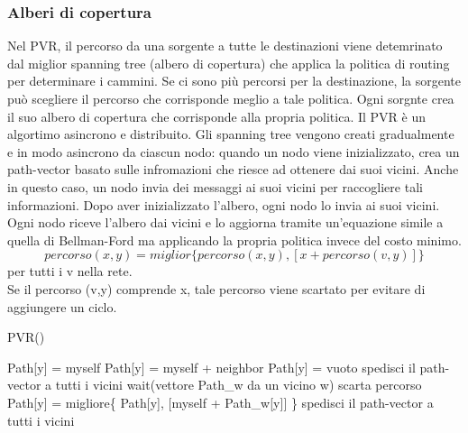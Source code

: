 \documentclass[12pt]{report}
\begin{document}
\subsubsection{Alberi di copertura}
Nel PVR, il percorso da una sorgente a tutte le destinazioni viene detemrinato dal miglior spanning tree (albero di copertura) che applica la politica di routing per determinare i cammini. Se ci sono più percorsi per la destinazione, la sorgente può scegliere il percorso che corrisponde meglio a tale politica. Ogni sorgnte crea il suo albero di copertura che corrisponde alla propria politica. Il PVR è un algortimo asincrono e distribuito. Gli spanning tree vengono creati gradualmente e in modo asincrono da ciascun nodo: quando un nodo viene inizializzato, crea un path-vector  basato sulle infromazioni che riesce ad ottenere dai suoi vicini. Anche in questo caso, un nodo invia dei messaggi ai suoi vicini per raccogliere tali informazioni. Dopo aver inizializzato l'albero, ogni nodo lo invia ai suoi vicini. Ogni nodo riceve l'albero dai vicini e lo aggiorna tramite un'equazione simile a quella di Bellman-Ford ma applicando la propria politica invece del costo minimo.
\[
	percorso(x,y) = miglior\{ percorso(x,y), [x + percorso(v,y)] \}
\]
per tutti i v nella rete. \\
Se il percorso (v,y) comprende x, tale percorso viene scartato per evitare di aggiungere un ciclo.
\begin{algorithm}[h]
	\caption{PVR()}
	\begin{algorithmic}
				Path[y] = myself
				Path[y] = myself + neighbor
			\Else
				Path[y] = vuoto
			\EndIf
		\EndFor
		\State spedisci il path-vector a tutti i vicini
			wait(vettore Path\_w da un vicino w)
					\State scarta percorso
				\Else
					\State Path[y] = migliore\{ Path[y], [myself + Path\_w[y]] \}
				\EndIf
			\EndFor
				\State spedisci il path-vector a tutti i vicini
			\EndIf
		\EndWhile
	\end{algorithmic}
\end{algorithm}
\end{document}
